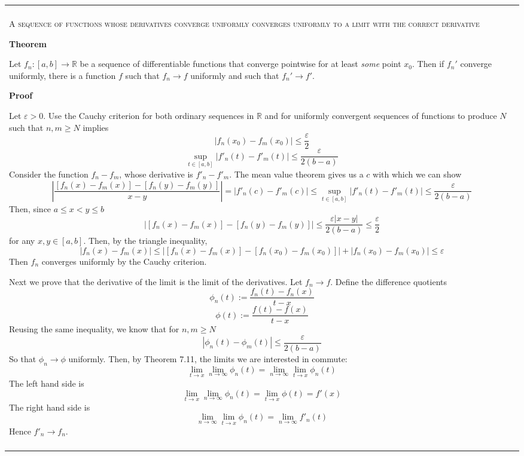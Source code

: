 \documentclass{article}
\newenvironment{myboxed}{\bigskip\noindent\begin{tabular}{|p{.975\linewidth}|}\hline \\}{\\\\\hline\end{tabular}\bigskip}
\begin{document}
\begin{myboxed}
    \textsc{A sequence of functions whose derivatives converge uniformly converges uniformly to a limit with the correct derivative}

    \textbf{Theorem}

    Let $f_n: [a,b] \rightarrow \mathbb{R}$ be a sequence of differentiable functions that converge pointwise for at least \textit{some} point $x_0$. Then if $f_n'$ converge uniformly, there is a function $f$ such that $f_n \rightarrow f$ uniformly and such that $f_n' \rightarrow f'$.

    \textbf{Proof}

    Let $\varepsilon > 0$. Use the Cauchy criterion for both ordinary sequences in $\mathbb{R}$ and for uniformly convergent sequences of functions to produce $N$ such that $n, m \geq N$ implies
    \[|f_n(x_0) - f_m(x_0)| \leq \frac{\varepsilon}{2}\]
    \[\sup_{t \in [a,b]}|f'_n(t) - f'_m(t)| \leq \frac{\varepsilon}{2(b-a)}\]
    Consider the function $f_n - f_m$, whose derivative is $f'_n - f'_m$. The mean value theorem gives us a $c$ with which we can show
    \[\left|\frac{[f_n(x) - f_m(x)] - [f_n(y) - f_m(y)]}{x-y}\right| = |f'_n(c) - f'_m(c)| \leq \sup_{t \in [a, b]} |f'_n(t) - f'_m(t)| \leq \frac{\varepsilon}{2(b-a)}\]
    Then, since $a \leq x < y \leq b$
    \[\left|[f_n(x) - f_m(x)] - [f_n(y) - f_m(y)]\right| \leq \frac{\varepsilon|x-y|}{2(b-a)} \leq \frac{\varepsilon}{2}\]
    for any $x, y \in [a, b]$. Then, by the triangle inequality,
    \[|f_n(x) - f_m(x)| \leq |[f_n(x) - f_m(x)] - [f_n(x_0) - f_m(x_0)]| + |f_n(x_0) - f_m(x_0)| \leq \varepsilon\]
    Then $f_n$ converges uniformly by the Cauchy criterion.

    Next we prove that the derivative of the limit is the limit of the derivatives. Let $f_n \rightarrow f$. Define the difference quotients
    \[\phi_n(t) := \frac{f_n(t) - f_n(x)}{t-x}\]
    \[\phi(t) := \frac{f(t) - f(x)}{t-x}\]
    Reusing the same inequality, we know that for $n, m \geq N$
    \[|\phi_n(t) - \phi_m(t)| \leq \frac{\varepsilon}{2(b-a)}\]
    So that $\phi_n \rightarrow \phi$ uniformly. Then, by Theorem 7.11, the limits we are interested in commute:
    \[\lim_{t \to x} \lim_{n \to \infty} \phi_n(t) = \lim_{n \to \infty} \lim_{t \to x} \phi_n(t)\]
    The left hand side is
    \[\lim_{t \to x} \lim_{n \to \infty} \phi_n(t) = \lim_{t \to x} \phi(t) = f'(x)\]
    The right hand side is
    \[\lim_{n \to \infty} \lim_{t \to x} \phi_n(t) = \lim_{n \to \infty} f'_n(t)\]
    Hence $f'_n \rightarrow f_n$.
\end{myboxed}
\end{document}
